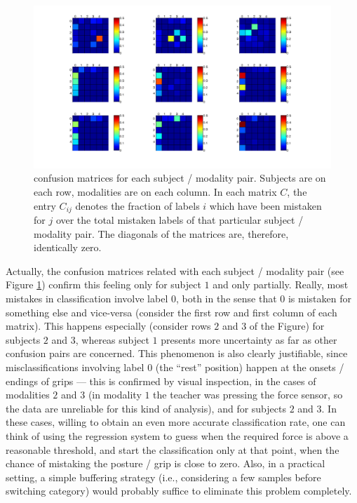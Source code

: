 \begin{figure}[!ht] \centering
  \includegraphics[width=\textwidth]{figs/confusion}
  \caption{confusion matrices for each subject / modality
    pair. Subjects are on each row, modalities are on each column. In
    each matrix $C$, the entry $C_{ij}$ denotes the fraction of labels
    $i$ which have been mistaken for $j$ over the total mistaken
    labels of that particular subject / modality pair. The diagonals
  of the matrices are, therefore, identically zero.}
  \label{fig:confusion}
\end{figure}

Actually, the confusion matrices related with each subject / modality
pair (see Figure \ref{fig:confusion}) confirm this feeling only for
subject $1$ and only partially. Really, most mistakes in
classification involve label $0$, both in the sense that $0$ is
mistaken for something else and vice-versa (consider the first row and
first column of each matrix). This happens especially (consider rows
$2$ and $3$ of the Figure) for subjects $2$ and $3$, whereas subject
$1$ presents more uncertainty as far as other confusion pairs are
concerned. This phenomenon is also clearly justifiable, since
misclassifications involving label $0$ (the ``rest'' position) happen
at the onsets / endings of grips --- this is confirmed by visual
inspection, in the cases of modalities $2$ and $3$ (in modality $1$
the teacher was pressing the force sensor, so the data are unreliable
for this kind of analysis), and for subjects $2$ and $3$. In these
cases, willing to obtain an even more accurate classification rate,
one can think of using the regression system to guess when the
required force is above a reasonable threshold, and start the
classification only at that point, when the chance of mistaking the
posture / grip is close to zero. Also, in a practical setting, a
simple buffering strategy (i.e., considering a few samples before
switching category) would probably suffice to eliminate this problem
completely.

